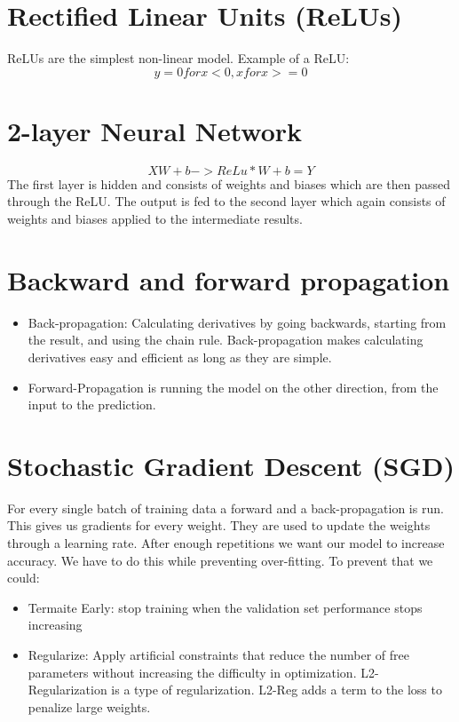 \documentclass{article}
\begin{document}
	\section{Rectified Linear Units (ReLUs)}
	ReLUs are the simplest non-linear model. Example of a ReLU:
	\begin{equation}
	y = {0 for x<0, x for x>=0}
	\end{equation}
	\section{2-layer Neural Network}
	\begin{equation}
	XW + b -> ReLu *W + b = Y
	\end{equation}
	The first layer is hidden and consists of weights and biases which are then passed through the ReLU. The output is fed to the second layer which again consists of weights and biases applied to the intermediate results.
	\section{Backward and forward propagation}
	\begin{itemize}
		\item Back-propagation: Calculating derivatives by going backwards, starting from the result, and using the chain rule. Back-propagation makes calculating derivatives easy and efficient as long as they are simple.
		\item Forward-Propagation is running the model on the other direction, from the input to the prediction.
	\end{itemize}
\section{Stochastic Gradient Descent (SGD)}
	For every single batch of training data a forward and a back-propagation is run. This gives us gradients for every weight. They are used to update the weights through a learning rate. After enough repetitions we want our model to increase accuracy. We have to do this while preventing over-fitting. To prevent that we could:
	\begin{itemize}
		\item Termaite Early: stop training when the validation set performance stops increasing
		\item Regularize: Apply artificial constraints that reduce the number of free parameters without increasing the difficulty in optimization. L2-Regularization is a type of regularization. L2-Reg adds a term to the loss to penalize large weights.
	\end{itemize}
\end{document}
